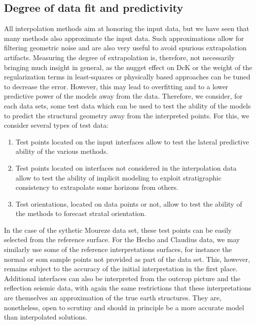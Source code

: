\documentclass[preprint]{ring20}
\begin{document}
\subsection{Degree of data fit and predictivity}

All interpolation methods aim at honoring the input data, but we have seen that many methods also approximate the input data. Such approximations allow for filtering geometric noise and are also very useful to avoid spurious extrapolation artifacts. 
Measuring the degree of extrapolation is, therefore, not necessarily bringing much insight in general, as the nugget effect on DcK or the weight of the regularization terms in least-squares or physically based approaches can be tuned to decrease the error. However, this may lead to overfitting and to a lower predictive power of the models away from the data. Therefore, we consider, for each data sets, some test data which can be used to test the ability of the models to predict the structural geometry away from the interpreted points. For this, we consider several types of test data:

\begin{enumerate}
	\item Test points located on the input interfaces allow to test the lateral predictive ability of the various methods.  
  \item Test points located on interfaces not considered in the interpolation data allow to test the ability of implicit modeling to exploit stratigraphic consistency to extrapolate some horizons from others. 
  \item Test orientations, located on data points or not, allow to test the ability of the methods to forecast stratal orientation. 
\end{enumerate}

In the case of the sythetic Moureze data set, these test points can be easily selected from the reference surface. For the Hecho and Claudius data, we may similarly use some of the reference interpretations surfaces, for instance the normal or som sample points not provided as part of the data set. This, however, remains subject to the accuracy of the initial interpretation in the first place. Additional interfaces can also be interpreted from the outcrop picture and the reflection seismic data, with again the same restrictions that these interpretations are themselves an approximation of the true earth structures. They are, nonetheless, open to scrutiny and should in principle be a more accurate model than interpolated solutions.
\end{document}
